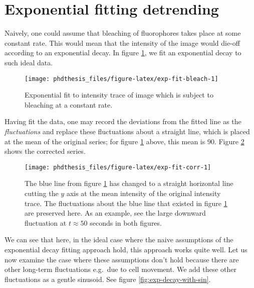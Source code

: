 \documentclass[12pt,]{book}
\theoremstyle{definition}
\theoremstyle{definition}
\theoremstyle{definition}
\theoremstyle{remark}
\begin{document}
\section{Exponential fitting
detrending}\label{exponential-fitting-detrending}

Naively, one could assume that bleaching of fluorophores takes place at
some constant rate. This would mean that the intensity of the image
would die-off according to an exponential decay. In figure
\ref{fig:exp-fit-bleach}, we fit an exponential decay to such ideal
data.




\begin{figure}

\texttt{[image: phdthesis\_files/figure-latex/exp-fit-bleach-1]} \hfill{}

\caption{Exponential fit to intensity trace of image
which is subject to bleaching at a constant rate.}\label{fig:exp-fit-bleach}
\end{figure}

Having fit the data, one may record the deviations from the fitted line
as the \emph{fluctuations} and replace these fluctuations about a
straight line, which is placed at the mean of the original series; for
figure \ref{fig:exp-fit-bleach} above, this mean is 90. Figure
\ref{fig:exp-fit-corr} shows the corrected series.








\begin{figure}

\texttt{[image: phdthesis\_files/figure-latex/exp-fit-corr-1]} \hfill{}

\caption{The blue line from figure
\ref{fig:exp-fit-bleach} has changed to a straight horizontal line
cutting the \(y\) axis at the mean intensity of the original intensity
trace. The fluctuations about the blue line that existed in figure
\ref{fig:exp-fit-bleach} are preserved here. As an example, see the
large downward fluctuation at \(t \approx 50\) seconds in both figures.}\label{fig:exp-fit-corr}
\end{figure}

We can see that here, in the ideal case where the naive assumptions of
the exponential decay fitting approach hold, this approach works quite
well. Let us now examine the case where these assumptions don't hold
because there are other long-term fluctuations e.g.~due to cell
movement. We add these other fluctuations as a gentle sinusoid. See
figure \ref{fig:exp-decay-with-sin}.
\end{document}
